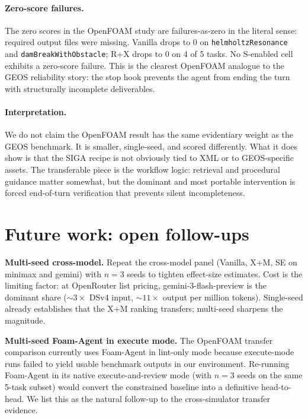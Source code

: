 \documentclass{article}
\begin{document}
\paragraph{Zero-score failures.}
The zero scores in the OpenFOAM study are failures-as-zero in the literal sense: required output files were missing. Vanilla drops to 0 on \texttt{helmholtzResonance} and \texttt{damBreakWithObstacle}; R+X drops to 0 on 4 of 5 tasks. No $\mathrm{S}$-enabled cell exhibits a zero-score failure. This is the clearest OpenFOAM analogue to the GEOS reliability story: the stop hook prevents the agent from ending the turn with structurally incomplete deliverables.

\paragraph{Interpretation.}
We do not claim the OpenFOAM result has the same evidentiary weight as the GEOS benchmark. It is smaller, single-seed, and scored differently. What it does show is that the SIGA recipe is not obviously tied to XML or to GEOS-specific assets. The transferable piece is the workflow logic: retrieval and procedural guidance matter somewhat, but the dominant and most portable intervention is forced end-of-turn verification that prevents silent incompleteness.

\section{Future work: open follow-ups}
\label{app:future-work}

\textbf{Multi-seed cross-model.} Repeat the cross-model panel (Vanilla, X+M, SE on minimax and gemini) with $n=3$ seeds to tighten effect-size estimates. Cost is the limiting factor: at OpenRouter list pricing, gemini-3-flash-preview is the dominant share (${\sim}3\times$ DSv4 input, ${\sim}11\times$ output per million tokens). Single-seed already establishes that the X+M ranking transfers; multi-seed sharpens the magnitude.

\textbf{Multi-seed Foam-Agent in execute mode.} The OpenFOAM transfer comparison currently uses Foam-Agent in lint-only mode because execute-mode runs failed to yield usable benchmark outputs in our environment. Re-running Foam-Agent in its native execute-and-review mode (with $n=3$ seeds on the same 5-task subset) would convert the constrained baseline into a definitive head-to-head. We list this as the natural follow-up to the cross-simulator transfer evidence.
\end{document}
